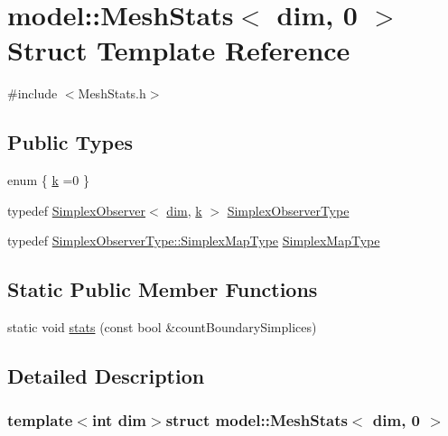 \hypertarget{structmodel_1_1_mesh_stats_3_01dim_00_010_01_4}{}\section{model\+:\+:Mesh\+Stats$<$ dim, 0 $>$ Struct Template Reference}
\label{structmodel_1_1_mesh_stats_3_01dim_00_010_01_4}


{\ttfamily \#include $<$Mesh\+Stats.\+h$>$}

\subsection*{Public Types}
\begin{DoxyCompactItemize}
\item 
enum \{ \hyperlink{structmodel_1_1_mesh_stats_3_01dim_00_010_01_4_acbdf2ee2672e0439b25e39f4d1c9bef6a570da8e2e4ce855ca72c3c0833f45c41}{k} =0
 \}
\item 
typedef \hyperlink{structmodel_1_1_simplex_observer}{Simplex\+Observer}$<$ \hyperlink{plot_nd_a_8m_a382f3ca768b275b8d563604f7fc7df73}{dim}, \hyperlink{structmodel_1_1_mesh_stats_3_01dim_00_010_01_4_acbdf2ee2672e0439b25e39f4d1c9bef6a570da8e2e4ce855ca72c3c0833f45c41}{k} $>$ \hyperlink{structmodel_1_1_mesh_stats_3_01dim_00_010_01_4_adca31e4696e0ce0cf499436a2e8c0916}{Simplex\+Observer\+Type}
\item 
typedef \hyperlink{structmodel_1_1_simplex_observer_a220336a365d54235796aef669aebbf45}{Simplex\+Observer\+Type\+::\+Simplex\+Map\+Type} \hyperlink{structmodel_1_1_mesh_stats_3_01dim_00_010_01_4_a9432efdd50cd41d86ceff02400fc4801}{Simplex\+Map\+Type}
\end{DoxyCompactItemize}
\subsection*{Static Public Member Functions}
\begin{DoxyCompactItemize}
\item 
static void \hyperlink{structmodel_1_1_mesh_stats_3_01dim_00_010_01_4_af4a7af1b89d363b5f9e07fca76b73153}{stats} (const bool \&count\+Boundary\+Simplices)
\end{DoxyCompactItemize}


\subsection{Detailed Description}
\subsubsection*{template$<$int dim$>$struct model\+::\+Mesh\+Stats$<$ dim, 0 $>$}



